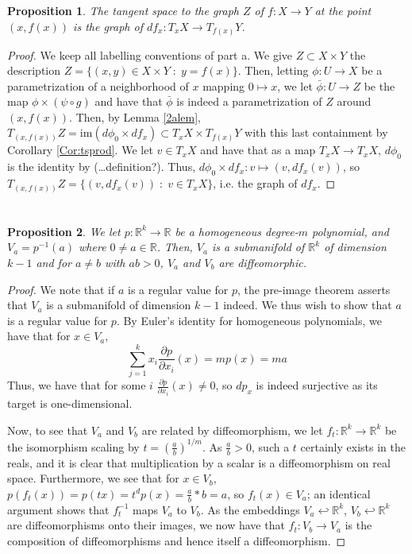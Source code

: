 \documentclass[english]{article}
\newcommand{\pydx}[2]{\frac{\partial #1}{\partial #2}}
\newcommand{\RR}{\mathbb{R}}
\newcommand{\prob}[1]{\setcounter{section}{#1-1}\section{}}
\newcommand{\prt}[1]{\setcounter{subsection}{#1-1}\subsection{}}
\newtheorem*{proposition*}{Proposition}
\theoremstyle{remark}
\theoremstyle{definition}
\newcommand{\im}{\mathrm{im}}
\begin{document}
\prt{2}
\begin{proposition*}
	The tangent space to the graph $Z$ of $f:X\to Y$ at the point $(x,f(x))$ is the graph of $df_x:T_xX\to T_{f(x)}Y$. 
\end{proposition*}
\begin{proof}
	We keep all labelling conventions of part a. We give $Z\subset X\times Y$ the description $Z=\{(x,y)\in X\times Y\;:\;y=f(x)\}$. Then, letting $\phi:U\to X$ be a parametrization of a neighborhood of $x$ mapping $0\mapsto x$, we let $\bar\phi:U\to Z$ be the map $\phi\times (\psi\circ g)$ and have that $\bar\phi$ is indeed a parametrization of $Z$ around $(x,f(x))$. Then, by Lemma \ref{2alem}, $T_{(x,f(x))}Z=\im (d\phi_0\times df_x)\subset T_xX\times T_{f(x)}Y$ with this last containment by Corollary \ref{Cor:tsprod}. We let $v\in T_xX$ and have that as a map $T_xX\to T_xX$, $d\phi_0$ is the identity by (\dots definition?).  Thus, $d\phi_0\times df_x:v\mapsto (v,df_x(v))$, so $T_{(x,f(x))}Z=\{(v,df_x(v))\;:\; v\in T_xX\}$, i.e. the graph of $df_x$. 
\end{proof}
\prob{3}
\begin{proposition*}
	We let $p:\RR^k\to \RR$ be a homogeneous degree-$m$ polynomial, and $V_a=p^{-1}(a)$ where $0\neq a\in \RR$. Then, $V_a$ is a submanifold of $\RR^k$ of dimension $k-1$ and for $a\neq b$ with $ab>0$, $V_a$ and $V_b$ are diffeomorphic.
\end{proposition*}
\begin{proof}
	We note that if $a$ is a regular value for $p$, the pre-image theorem asserts that $V_a$ is a submanifold of dimension $k-1$ indeed. We thus wish to show that $a$ is a regular value for $p$. By Euler's identity for homogeneous polynomials, we have that for $x\in V_a$,
	$$\sum_{j=1}^kx_i\pydx{p}{x_i}(x)=mp(x)=ma$$
	Thus, we have that for some $i$ $\pydx{p}{x_i}(x)\neq 0$, so $dp_x$ is indeed surjective as its target is one-dimensional.
	
	Now, to see that $V_a$ and $V_b$ are related by diffeomorphism, we let $f_t:\RR^k\to \RR^k$ be the isomorphism scaling by $t=\left(\frac{a}{b}\right)^{1/m}$. As $\frac{a}{b}>0$, such a $t$ certainly exists in the reals, and it is clear that multiplication by a scalar is a diffeomorphism on real space. Furthermore, we see that for $x\in V_b$, $p(f_t(x))=p(tx)=t^dp(x)=\frac{a}{b}*b=a$, so $f_t(x)\in V_a$; an identical argument shows that $f_t^{-1}$ maps $V_a$ to $V_b$. As the embeddings $V_a\hookleftarrow \RR^k$, $V_b\hookleftarrow \RR^k$ are diffeomorphisms onto their images, we now have that $f_t:V_b\to V_a$ is the composition of diffeomorphisms and hence itself a diffeomorphism.  
	
\end{proof}
\end{document}
